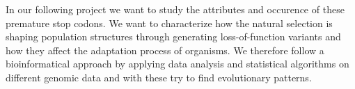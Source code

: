 In our following project we want to study the attributes and occurence of these premature stop codons. We want to characterize how the natural selection is shaping population structures through generating loss-of-function variants and how they affect the adaptation process of organisms. We therefore follow a bioinformatical approach by applying data analysis and statistical algorithms on different genomic data and with these try to find evolutionary patterns. 